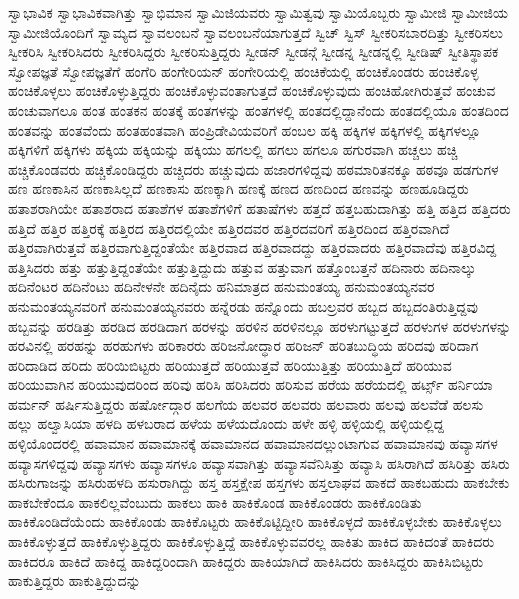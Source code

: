 {ಸ್ವಾಭಾವಿಕ
ಸ್ವಾಭಾವಿಕವಾಗಿತ್ತು
ಸ್ವಾಭಿಮಾನ
ಸ್ವಾಮಿಜಿಯವರು
ಸ್ವಾಮಿತ್ವವು
ಸ್ವಾಮಿಯೊಬ್ಬರು
ಸ್ವಾಮೀಜಿ
ಸ್ವಾಮೀಜಿಯ
ಸ್ವಾಮೀಜಿಯೊಂದಿಗೆ
ಸ್ವಾಮ್ಯದ
ಸ್ವಾವಲಂಬನೆ
ಸ್ವಾವಲಂಬನೆಯಾಗುತ್ತದೆ
ಸ್ವಿಚ್
ಸ್ವಿಸ್
ಸ್ವೀಕರಿಸಬಾರದಿತ್ತು
ಸ್ವೀಕರಿಸಲು
ಸ್ವೀಕರಿಸಿ
ಸ್ವೀಕರಿಸಿದರು
ಸ್ವೀಕರಿಸಿದ್ದರು
ಸ್ವೀಕರಿಸುತ್ತಿದ್ದರು
ಸ್ವೀಡನ್
ಸ್ವೀಡನ್ಗೆ
ಸ್ವೀಡನ್ನ
ಸ್ವೀಡನ್ನಲ್ಲಿ
ಸ್ವೀಡಿಷ್
ಸ್ವೀತಿಸ್ಥಾಪಕ
ಸ್ವೋಪಜ್ಞತೆ
ಸ್ವೋಪಜ್ಞತೆಗೆ
ಹಂಗೆರಿ
ಹಂಗೇರಿಯನ್
ಹಂಗೇರಿಯಲ್ಲಿ
ಹಂಚಿಕೆಯಲ್ಲಿ
ಹಂಚಿಕೊಂಡರು
ಹಂಚಿಕೊಳ್ಳ
ಹಂಚಿಕೊಳ್ಳಲು
ಹಂಚಿಕೊಳ್ಳುತ್ತಿದ್ದರು
ಹಂಚಿಕೊಳ್ಳುವಂತಾಗುತ್ತದೆ
ಹಂಚಿಕೊಳ್ಳುವುದು
ಹಂಚಿಹೋಗಿರುತ್ತವೆ
ಹಂಚುವ
ಹಂಚುವಾಗಲೂ
ಹಂತ
ಹಂತಕನ
ಹಂತಕ್ಕೆ
ಹಂತಗಳನ್ನು
ಹಂತಗಳಲ್ಲಿ
ಹಂತದಲ್ಲಿದ್ದಾನೆಂದು
ಹಂತದಲ್ಲಿಯೂ
ಹಂತದಿಂದ
ಹಂತವನ್ನು
ಹಂತವೆಂದು
ಹಂತಹಂತವಾಗಿ
ಹಂಪ್ರಿಡೇವಿಯವರಿಗೆ
ಹಂಬಲ
ಹಕ್ಕಿ
ಹಕ್ಕಿಗಳ
ಹಕ್ಕಿಗಳಲ್ಲಿ
ಹಕ್ಕಿಗಳಲ್ಲೂ
ಹಕ್ಕಿಗಳಿಗೆ
ಹಕ್ಕಿಗಳು
ಹಕ್ಕಿಯ
ಹಕ್ಕಿಯನ್ನು
ಹಕ್ಕಿಯು
ಹಗಲಲ್ಲಿ
ಹಗಲು
ಹಗಲೂ
ಹಗುರವಾಗಿ
ಹಚ್ಚಲು
ಹಚ್ಚಿ
ಹಚ್ಚಿಕೊಂಡವರು
ಹಚ್ಚಿಕೊಂಡಿದ್ದರು
ಹಚ್ಚಿದರು
ಹಚ್ಚುವುದು
ಹಜಾರಗಳಿದ್ದವು
ಹಠಮಾರಿತನಕ್ಕೂ
ಹಠವೂ
ಹಡಗುಗಳ
ಹಣ
ಹಣಕಾಸಿನ
ಹಣಕಾಸಿಲ್ಲದೆ
ಹಣಕಾಸು
ಹಣಕ್ಕಾಗಿ
ಹಣಕ್ಕೆ
ಹಣದ
ಹಣದಿಂದ
ಹಣವನ್ನು
ಹಣಹೂಡಿದ್ದರು
ಹತಾಶರಾಗಿಯೇ
ಹತಾಶರಾದ
ಹತಾಶೆಗಳ
ಹತಾಶೆಗಳಿಗೆ
ಹತಾಷೆಗಳು
ಹತ್ತದೆ
ಹತ್ತಬಹುದಾಗಿತ್ತು
ಹತ್ತಿ
ಹತ್ತಿದ
ಹತ್ತಿದರು
ಹತ್ತಿದೆ
ಹತ್ತಿರ
ಹತ್ತಿರಕ್ಕೆ
ಹತ್ತಿರದ
ಹತ್ತಿರದಲ್ಲಿಯೇ
ಹತ್ತಿರದವರ
ಹತ್ತಿರದವರಿಗೆ
ಹತ್ತಿರದಿಂದ
ಹತ್ತಿರವಾಗಿದೆ
ಹತ್ತಿರವಾಗಿರುತ್ತವೆ
ಹತ್ತಿರವಾಗುತ್ತಿದ್ದಂತೆಯೇ
ಹತ್ತಿರವಾದ
ಹತ್ತಿರವಾದದ್ದು
ಹತ್ತಿರವಾದರು
ಹತ್ತಿರವಾದೆವು
ಹತ್ತಿರವಿದ್ದ
ಹತ್ತಿಸಿದರು
ಹತ್ತು
ಹತ್ತುತ್ತಿದ್ದಂತೆಯೇ
ಹತ್ತುತ್ತಿದ್ದುದು
ಹತ್ತುವ
ಹತ್ತುವಾಗ
ಹತ್ತೊಂಬತ್ತನೆ
ಹದಿನಾರು
ಹದಿನಾಲ್ಕು
ಹದಿನೆಂಟರ
ಹದಿನೆಂಟು
ಹದಿನೇಳನೇ
ಹದಿನೈದು
ಹನಿಮಾತ್ರದ
ಹನುಮಂತಯ್ಯ
ಹನುಮಂತಯ್ಯನವರ
ಹನುಮಂತಯ್ಯನವರಿಗೆ
ಹನುಮಂತಯ್ಯನವರು
ಹನ್ನೆರಡು
ಹನ್ನೊಂದು
ಹಬಲ್ರವರ
ಹಬ್ಬದ
ಹಬ್ಬದಂತಿರುತ್ತಿದ್ದವು
ಹಬ್ಬವನ್ನು
ಹರಡಿತ್ತು
ಹರಡಿದ
ಹರಡಿದಾಗ
ಹರಳನ್ನು
ಹರಳಿನ
ಹರಳಿನಲ್ಲೂ
ಹರಳುಗಟ್ಟುತ್ತದೆ
ಹರಳುಗಳ
ಹರಳುಗಳನ್ನು
ಹರವಿನಲ್ಲಿ
ಹರಹನ್ನು
ಹರಹುಗಳು
ಹರಿಕಾರರು
ಹರಿಜನೋದ್ಧಾರ
ಹರಿಜನ್
ಹರಿತಬುದ್ಧಿಯ
ಹರಿದವು
ಹರಿದಾಗ
ಹರಿದಾಡಿದ
ಹರಿದು
ಹರಿಯಿಬಿಟ್ಟರು
ಹರಿಯುತ್ತದೆ
ಹರಿಯುತ್ತವೆ
ಹರಿಯುತ್ತಿತ್ತು
ಹರಿಯುತ್ತಿದೆ
ಹರಿಯುವ
ಹರಿಯುವಾಗಿನ
ಹರಿಯುವುದರಿಂದ
ಹರಿವು
ಹರಿಸಿ
ಹರಿಸಿದರು
ಹರಿಸುವ
ಹರೆಯ
ಹರೆಯದಲ್ಲಿ
ಹರ್ಟ್ಸ್
ಹರ್ನಿಯಾ
ಹರ್ಮನ್
ಹರ್ಷಿಸುತ್ತಿದ್ದರು
ಹರ್ಷೋದ್ಗಾರ
ಹಲಗೆಯ
ಹಲವರ
ಹಲವರು
ಹಲವಾರು
ಹಲವು
ಹಲವೆಡೆ
ಹಲಸು
ಹಲ್ಲು
ಹಲ್ವಾಸಿಯಾ
ಹಳದಿ
ಹಳಬರಾದ
ಹಳೆಯ
ಹಳೆಯದೊಂದು
ಹಳೇ
ಹಳ್ಳಿ
ಹಳ್ಳಿಯಲ್ಲಿ
ಹಳ್ಳಿಯಲ್ಲಿದ್ದ
ಹಳ್ಳಿಯೊಂದರಲ್ಲಿ
ಹವಾಮಾನ
ಹವಾಮಾನಕ್ಕೆ
ಹವಾಮಾನದ
ಹವಾಮಾನದಲ್ಲುಂಟಾಗುವ
ಹವಾಮಾನವು
ಹವ್ಯಾಸಗಳ
ಹವ್ಯಾಸಗಳಿದ್ದವು
ಹವ್ಯಾಸಗಳು
ಹವ್ಯಾಸಗಳೂ
ಹವ್ಯಾಸವಾಗಿತ್ತು
ಹವ್ಯಾಸವೆನಿಸಿತ್ತು
ಹವ್ಯಾಸಿ
ಹಸಿರಾಗಿದೆ
ಹಸಿರಿತ್ತು
ಹಸಿರು
ಹಸಿರುಗಾಜನ್ನು
ಹಸಿರುಹಳದಿ
ಹಸುರಾಗಿದ್ದು
ಹಸ್ತ
ಹಸ್ತಕ್ಷೇಪ
ಹಸ್ತಗಳು
ಹಸ್ತಲಾಘವ
ಹಾಕದೆ
ಹಾಕಬಹುದು
ಹಾಕಬೇಕು
ಹಾಕಬೇಕೆಂದೂ
ಹಾಕಲಿಲ್ಲವೆಂಬುದು
ಹಾಕಲು
ಹಾಕಿ
ಹಾಕಿಕೊಂಡ
ಹಾಕಿಕೊಂಡರು
ಹಾಕಿಕೊಂಡಿತು
ಹಾಕಿಕೊಂಡಿದೆಯೆಂದು
ಹಾಕಿಕೊಂಡು
ಹಾಕಿಕೊಟ್ಟರು
ಹಾಕಿಕೊಟ್ಟಿದ್ದೀರಿ
ಹಾಕಿಕೊಳ್ಳದೆ
ಹಾಕಿಕೊಳ್ಳಬೇಕು
ಹಾಕಿಕೊಳ್ಳಲು
ಹಾಕಿಕೊಳ್ಳುತ್ತದೆ
ಹಾಕಿಕೊಳ್ಳುತ್ತಿದ್ದರು
ಹಾಕಿಕೊಳ್ಳುತ್ತಿದ್ದೆ
ಹಾಕಿಕೊಳ್ಳುವವರಲ್ಲ
ಹಾಕಿತು
ಹಾಕಿದ
ಹಾಕಿದಂತೆ
ಹಾಕಿದರು
ಹಾಕಿದರೂ
ಹಾಕಿದೆ
ಹಾಕಿದ್ದ
ಹಾಕಿದ್ದರಿಂದಾಗಿ
ಹಾಕಿದ್ದರು
ಹಾಕಿಯಾಗಿದೆ
ಹಾಕಿಸಿದರು
ಹಾಕಿಸಿದ್ದರು
ಹಾಕಿಸಿಬಿಟ್ಟರು
ಹಾಕುತ್ತಿದ್ದರು
ಹಾಕುತ್ತಿದ್ದುದನ್ನು
}
